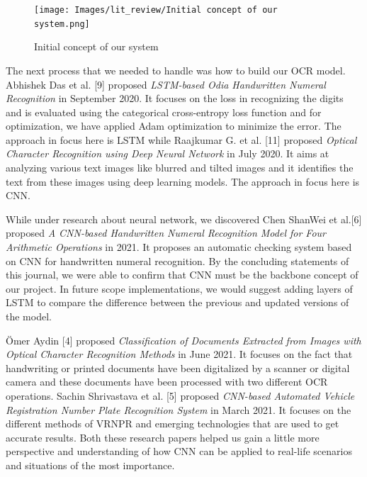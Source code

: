 \begin{figure}[h!]
    \centering
    \texttt{[image: Images/lit\_review/Initial concept of our system.png]}
    \caption{Initial concept of our system}
\end{figure}



\noindent
The next process that we needed to handle was how to build our OCR model. Abhishek Das et al. [9] proposed {\it LSTM-based  Odia  Handwritten  Numeral Recognition} in September 2020. It focuses on the loss in recognizing the digits and is evaluated using the categorical cross-entropy loss function and for optimization, we have applied Adam optimization to minimize the error. The approach in focus here is LSTM while Raajkumar G. et al. [11] proposed {\it Optical Character Recognition using Deep Neural Network} in July 2020. It aims at analyzing various text images like blurred and tilted images and it identifies the text from these images using deep learning models. The approach in focus here is CNN.

\noindent
While under research about neural network, we discovered Chen ShanWei et al.[6] proposed {\it A CNN-based Handwritten Numeral Recognition Model for Four Arithmetic Operations} in 2021. It proposes an automatic checking system based on CNN for handwritten numeral recognition. By the concluding statements of this journal, we were able to confirm that CNN must be the backbone concept of our project. In future scope implementations, we would suggest adding layers of LSTM to compare the difference between the previous and updated versions of the model.

\clearpage

\noindent
Ömer Aydin [4] proposed {\it Classification of Documents Extracted from Images with Optical Character Recognition Methods} in June 2021. It focuses on the fact that handwriting or printed documents have been digitalized by a scanner or digital camera and these documents have been processed with two different OCR operations. Sachin Shrivastava et al. [5] proposed {\it CNN-based Automated Vehicle Registration Number Plate Recognition System} in March 2021. It focuses on the different methods of VRNPR and emerging technologies that are used to get accurate results. Both these research papers helped us gain a little more perspective and understanding of how CNN can be applied to real-life scenarios and situations of the most importance. 

